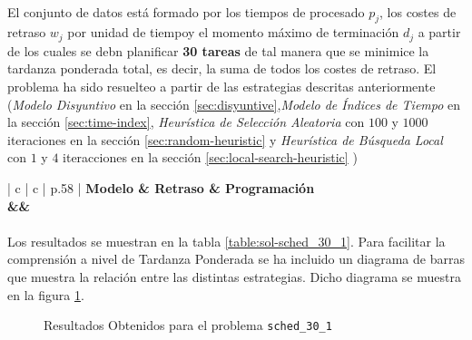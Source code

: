 \documentclass[spanish]{article}
\begin{document}
			\paragraph{}
			El conjunto de datos está formado por los tiempos de procesado $p_j$, los costes de retraso $w_j$ por unidad de tiempoy el momento máximo de terminación $d_j$ a partir de los cuales se debn planificar \textbf{30 tareas} de tal manera que se minimice la tardanza ponderada total, es decir, la suma de todos los costes de retraso. El problema ha sido resuelteo a partir de las estrategias descritas anteriormente (\emph{Modelo Disyuntivo} en la sección \ref{sec:disyuntive},\emph{Modelo de Índices de Tiempo} en la sección \ref{sec:time-index}, \emph{Heurística de Selección Aleatoria} con $100$ y $1000$ iteraciones en la sección \ref{sec:random-heuristic} y \emph{Heurística de Búsqueda Local} con $1$ y $4$ iteracciones en la sección \ref{sec:local-search-heuristic} )


			\begin{table}[h]
				\centering
				\begin{tabu}{ | c | c | p{.58\linewidth} |}
					\hline
					\bfseries Modelo & \bfseries Retraso & \bfseries Programación
					{\\\hline\model&\delay&\schedule}
					\\\hline
				\end{tabu}
				\caption{Resultados Obtenidos para el problema \texttt{sched\_30\_1}}
				\label{table:sol-sched_30_1}
			\end{table}

			\paragraph{}
			Los resultados se muestran en la tabla \ref{table:sol-sched_30_1}. Para facilitar la comprensión a nivel de Tardanza Ponderada se ha incluido un diagrama de barras que muestra la relación entre las distintas estrategias. Dicho diagrama se muestra en la figura \ref{plot:sol-sched_30_1}.


			\begin{figure}[h]
				\begin{center}
				\end{center}
				\caption{Resultados Obtenidos para el problema \texttt{sched\_30\_1}}
				\label{plot:sol-sched_30_1}
			\end{figure}
\end{document}
